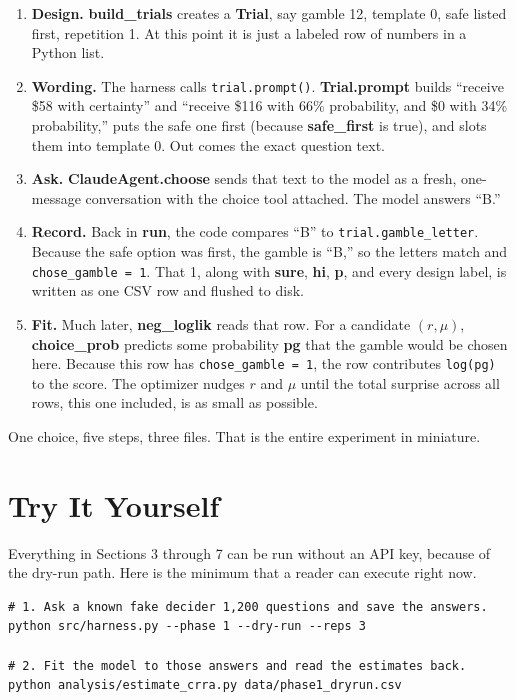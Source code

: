 \documentclass[11pt]{article}
\newcommand{\file}[1]{\textbf{\ttfamily #1}}
\begin{document}
\begin{enumerate}
\item \textbf{Design.} \file{build\_trials} creates a \file{Trial}, say gamble 12, template 0, safe
listed first, repetition 1. At this point it is just a labeled row of numbers in a Python list.
\item \textbf{Wording.} The harness calls \verb|trial.prompt()|. \file{Trial.prompt} builds
``receive \$58 with certainty'' and ``receive \$116 with 66\% probability, and \$0 with 34\%
probability,'' puts the safe one first (because \file{safe\_first} is true), and slots them into
template 0. Out comes the exact question text.
\item \textbf{Ask.} \file{ClaudeAgent.choose} sends that text to the model as a fresh, one-message
conversation with the choice tool attached. The model answers ``B.''
\item \textbf{Record.} Back in \file{run}, the code compares ``B'' to \verb|trial.gamble_letter|.
Because the safe option was first, the gamble is ``B,'' so the letters match and
\verb|chose_gamble = 1|. That 1, along with \file{sure}, \file{hi}, \file{p}, and every design label,
is written as one CSV row and flushed to disk.
\item \textbf{Fit.} Much later, \file{neg\_loglik} reads that row. For a candidate $(r, \mu)$,
\file{choice\_prob} predicts some probability \file{pg} that the gamble would be chosen here. Because
this row has \verb|chose_gamble = 1|, the row contributes \verb|log(pg)| to the score. The optimizer
nudges $r$ and $\mu$ until the total surprise across all rows, this one included, is as small as
possible.
\end{enumerate}

One choice, five steps, three files. That is the entire experiment in miniature.

\section{Try It Yourself}

Everything in Sections 3 through 7 can be run without an API key, because of the dry-run path. Here is
the minimum that a reader can execute right now.

\begin{lstlisting}[style=sh]
# 1. Ask a known fake decider 1,200 questions and save the answers.
python src/harness.py --phase 1 --dry-run --reps 3

# 2. Fit the model to those answers and read the estimates back.
python analysis/estimate_crra.py data/phase1_dryrun.csv
\end{lstlisting}
\end{document}
